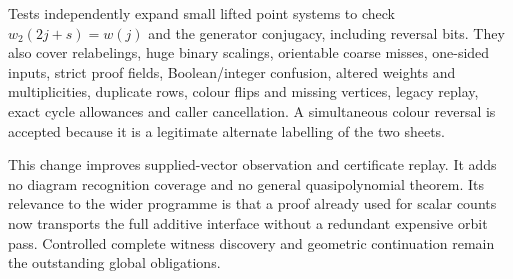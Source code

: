 Tests independently expand small lifted point systems to check
$w_2(2j+s)=w(j)$ and the generator conjugacy, including reversal bits. They
also cover relabelings, huge binary scalings, orientable coarse misses,
one-sided inputs, strict proof fields, Boolean/integer confusion, altered
weights and multiplicities, duplicate rows, colour flips and missing vertices,
legacy replay, exact cycle allowances and caller cancellation. A simultaneous
colour reversal is accepted because it is a legitimate alternate labelling
of the two sheets.



This change improves supplied-vector observation and certificate replay.
It adds no diagram recognition coverage and no general quasipolynomial
theorem. Its relevance to the wider programme is that a proof already used
for scalar counts now transports the full additive interface without a
redundant expensive orbit pass. Controlled complete witness discovery and
geometric continuation remain the outstanding global obligations.
